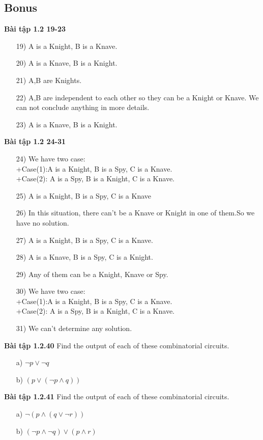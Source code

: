 \documentclass[a4paper]{article}
\begin{document}
\subsection{Bonus}
\textbf{Bài tập 1.2 19-23}
\begin{enumerate}
	\item[19)] A is a Knight, B is a Knave.
	\item[20)] A is a Knave, B is a Knight.
	\item[21)] A,B are Knights.
	\item[22)] A,B are independent to each other  so they can be a Knight or Knave. We can not conclude anything in more details.
	\item[23)] A is a Knave, B is a Knight.
\end{enumerate}
\textbf{Bài tập 1.2 24-31}
\begin{enumerate}
	\item[24)] We have two case:\\+Case(1):A is a Knight, B is a Spy, C is a Knave.\\+Case(2): A is a Spy, B is a Knight, C is a Knave.
	\item[25)] A is a Knight, B is a Spy, C is a Knave
	\item[26)] In this situation, there can't be a Knave or Knight in one of them.So we have no solution.
	\item[27)] A is a Knight, B is a Spy, C is a Knave.
	\item[28)] A is a Knave, B is a Spy, C is a Knight.
	\item[29)] Any of them can be a Knight, Knave or Spy.
	\item[30)] We have two case:\\+Case(1):A is a Knight, B is a Spy, C is a Knave.\\+Case(2): A is a Spy, B is a Knight, C is a Knave.
	\item[31)] We can't determine any solution.
\end{enumerate}
\textbf{Bài tập 1.2.40} Find the output of each of these combinatorial circuits.\\
\begin{enumerate}
	\item[a)] $\lnot p \lor  \lnot q$
	\item[b)] $(p \lor (\lnot p \land q))$	
\end{enumerate}	
\textbf{Bài tập 1.2.41} Find the output of each of these combinatorial circuits.\\
\begin{enumerate}
	\item[a)] $\lnot(p \land (q \lor \lnot r))$
	\item[b)] $(\lnot p \land \lnot q) \lor (p \land r)$	
\end{enumerate}
\end{document}
